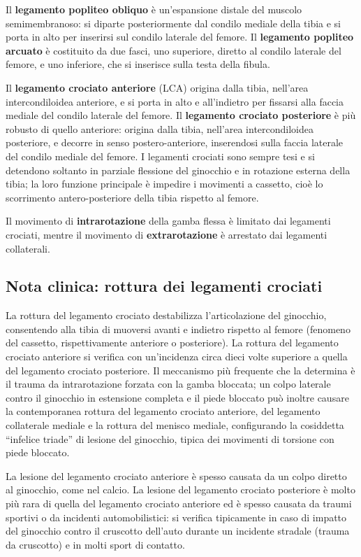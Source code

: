 Il \textbf{legamento popliteo obliquo} è un'espansione distale del muscolo
semimembranoso: si diparte posteriormente dal condilo mediale della tibia
e si porta in alto per inserirsi sul condilo laterale del femore. Il
\textbf{legamento popliteo arcuato} è costituito da due fasci, uno
superiore, diretto al condilo laterale del femore, e uno inferiore, che si
inserisce sulla testa della fibula.

Il \textbf{legamento crociato anteriore} (LCA) origina dalla tibia,
nell'area intercondiloidea anteriore, e si porta in alto e all'indietro
per fissarsi alla faccia mediale del condilo laterale del femore. Il
\textbf{legamento crociato posteriore} è più robusto di quello anteriore:
origina dalla tibia, nell'area intercondiloidea posteriore, e decorre in
senso postero-anteriore, inserendosi sulla faccia laterale del condilo
mediale del femore. I legamenti crociati sono sempre tesi e si detendono
soltanto in parziale flessione del ginocchio e in rotazione esterna della
tibia; la loro funzione principale è impedire i movimenti a cassetto,
cioè lo scorrimento antero-posteriore della tibia rispetto al femore.

Il movimento di \textbf{intrarotazione} della gamba flessa è limitato dai
legamenti crociati, mentre il movimento di \textbf{extrarotazione} è
arrestato dai legamenti collaterali.

\subsection{Nota clinica: rottura dei legamenti crociati}

La rottura del legamento crociato destabilizza l'articolazione del
ginocchio, consentendo alla tibia di muoversi avanti e indietro rispetto
al femore (fenomeno del cassetto, rispettivamente anteriore o
posteriore). La rottura del legamento crociato anteriore si verifica con
un'incidenza circa dieci volte superiore a quella del legamento crociato
posteriore. Il meccanismo più frequente che la determina è il trauma da
intrarotazione forzata con la gamba bloccata; un colpo laterale contro il
ginocchio in estensione completa e il piede bloccato può inoltre causare
la contemporanea rottura del legamento crociato anteriore, del legamento
collaterale mediale e la rottura del menisco mediale, configurando la
cosiddetta ``infelice triade'' di lesione del ginocchio, tipica dei
movimenti di torsione con piede bloccato.

La lesione del legamento crociato anteriore è spesso causata da un colpo
diretto al ginocchio, come nel calcio. La lesione del legamento crociato
posteriore è molto più rara di quella del legamento crociato anteriore ed
è spesso causata da traumi sportivi o da incidenti automobilistici: si
verifica tipicamente in caso di impatto del ginocchio contro il cruscotto
dell'auto durante un incidente stradale (trauma da cruscotto) e in molti
sport di contatto.

